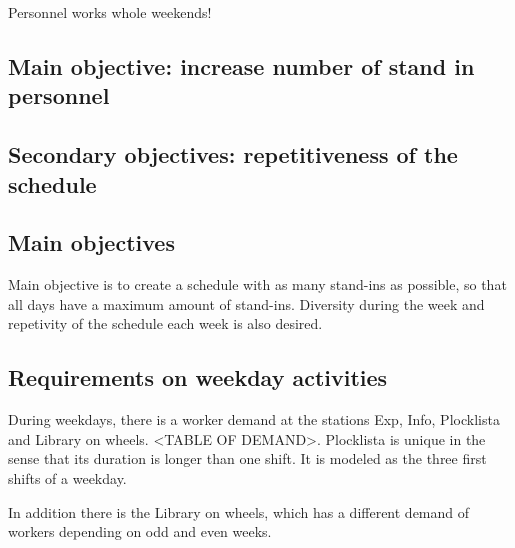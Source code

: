 \begin{table}[h]
\begin{tabularx}{\textwidth}{|X|l|l|l|l|X|}
\end{tabularx}
\end{table}

Personnel works whole weekends!

\subsection{Main objective: increase number of stand in personnel}

\subsection{Secondary objectives: repetitiveness of the schedule}


\iffalse
\subsection{Main objectives}
Main objective is to create a schedule with as many stand-ins as possible, so that all days have a maximum amount of stand-ins. Diversity during the week and repetivity of the schedule each week is also desired.

\subsection{Requirements on weekday activities}
During weekdays, there is a worker demand at the stations Exp, Info, Plocklista and Library on wheels. <TABLE OF DEMAND>. Plocklista is unique in the sense that its duration is longer than one shift. It is modeled as the three first shifts of a weekday.

In addition there is the Library on wheels, which has a different demand of workers depending on odd and even weeks. 
